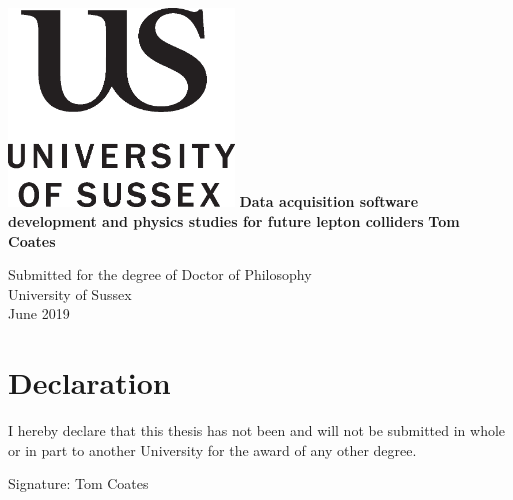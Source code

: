 \documentclass[a4paper,11pt]{report}
\begin{document}


\thispagestyle{empty}
\begin{center}
\includegraphics[width=6cm]{../Pictures/uslogonew.eps}
\vskip40mm
\huge\textbf{Data acquisition software development and physics studies for future lepton colliders}
\vskip5mm
\Large\textbf{Tom Coates}
\normalsize
\end{center}
\vfill
\begin{flushleft}
\large
Submitted for the degree of Doctor of Philosophy \\
University of Sussex	\\
June 2019
\end{flushleft}		

\chapter*{Declaration}
I hereby declare that this thesis has not been and will not be submitted in whole or in part to another University for the award of any other degree.


\vskip5mm
Signature:
\vskip20mm
Tom Coates
\end{document}
